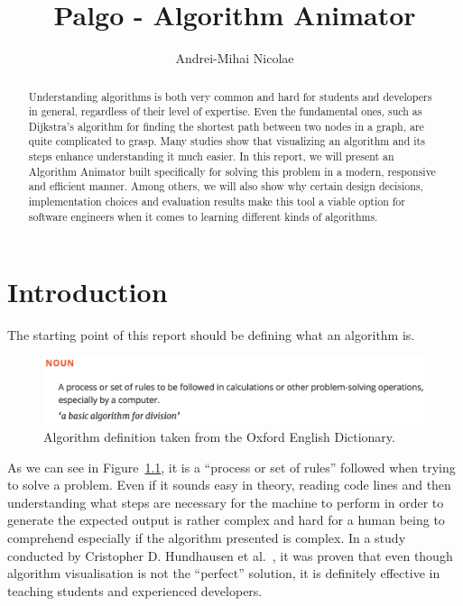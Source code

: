 \documentclass{l4proj}
\begin{document}
\title{Palgo - Algorithm Animator}
\author{Andrei-Mihai Nicolae}
\maketitle

\begin{abstract}
Understanding algorithms is both very common and hard for students and developers in general,
regardless of their level of expertise. Even the fundamental ones, such as Dijkstra's algorithm
for finding the shortest path between two nodes in a graph, are quite complicated to grasp. Many
studies show that visualizing an algorithm and its steps enhance understanding it much easier. In
this report, we will present an Algorithm Animator built specifically for solving this problem
in a modern, responsive and efficient manner. Among others, we will also show why certain design decisions, implementation choices and
evaluation results make this tool a viable option for software engineers when it comes to learning different kinds of
algorithms.
\end{abstract}

\educationalconsent

\tableofcontents
\chapter{Introduction}
\label{intro}

The starting point of this report should be defining what an algorithm is.

\begin{figure}[!ht]
\centering
\includegraphics[scale=0.5]{algorithm}
\caption{Algorithm definition taken from the Oxford English Dictionary.}
\label{fig:algorithm}
\end{figure}

As we can see in Figure~\ref{fig:algorithm}, it is a ``process or set of rules'' followed when trying to solve a
problem. Even if it sounds easy in theory, reading code lines and then understanding what steps are necessary for
the machine to perform in order to generate the expected output is rather complex and hard for a human being to
comprehend especially if the algorithm presented is complex. In a study conducted by Cristopher D. Hundhausen et al.~\cite{av}, it was
proven that even though algorithm visualisation is not the ``perfect'' solution, it is definitely effective in teaching students and experienced developers.
\end{document}
